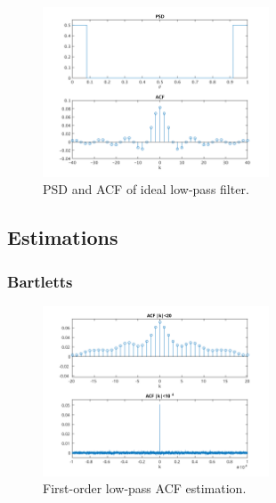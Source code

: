 \begin{figure}[!ht]
\centering
\includegraphics[width=0.6\textwidth]{bilder/Lab1/Lab1fig2.svg}
\caption{PSD and ACF of ideal low-pass filter.}
\label{fig:Lab1fig2}
\end{figure}


\subsection{Estimations}


\subsubsection{Bartletts}

\begin{figure}[!ht]
\centering
\includegraphics[width=0.6\textwidth]{bilder/Lab1/Lab1fig3.svg}
\caption{First-order low-pass ACF estimation.}
\label{fig:Lab1fig3}
\end{figure}

